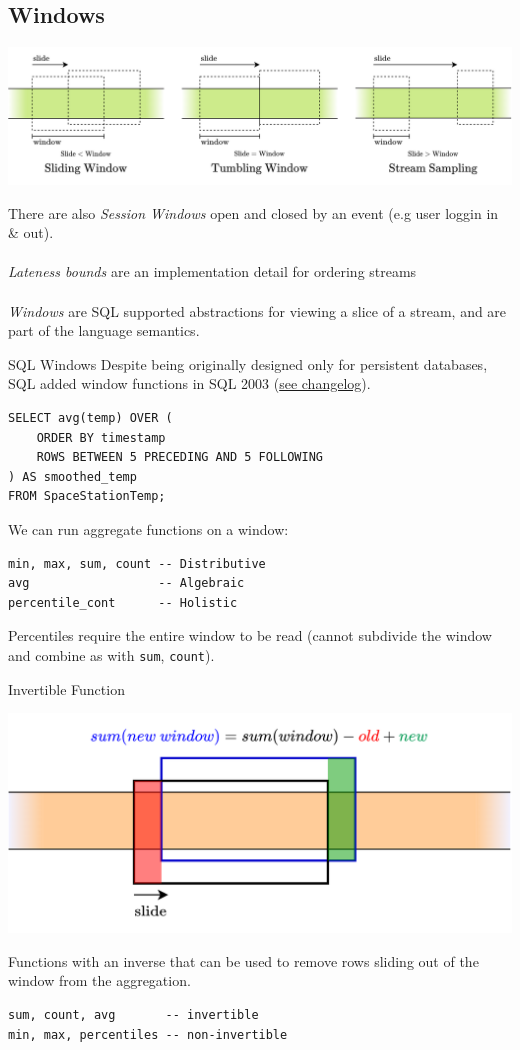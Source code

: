 \subsection{Windows}
\begin{center}
    \includegraphics[width=.9\textwidth]{streams/images/window_types.drawio.png}
\end{center}
There are also \textit{Session Windows} open and closed by an event (e.g user loggin in \& out).
\\
\\ \textit{Lateness bounds} are an implementation detail for ordering streams
\\ 
\\ \textit{Windows} are SQL supported abstractions for viewing a slice of a stream, and are part of the language semantics.
\begin{sidenotebox}{SQL Windows}
    Despite being originally designed only for persistent databases, SQL added window functions in SQL 2003 (\href{https://en.wikipedia.org/wiki/SQL:2003}{see changelog}).
\end{sidenotebox}
\begin{verbatim}
SELECT avg(temp) OVER (
    ORDER BY timestamp
    ROWS BETWEEN 5 PRECEDING AND 5 FOLLOWING
) AS smoothed_temp
FROM SpaceStationTemp;
\end{verbatim}
We can run aggregate functions on a window:
\begin{verbatim}
min, max, sum, count -- Distributive
avg                  -- Algebraic
percentile_cont      -- Holistic
\end{verbatim}
Percentiles require the entire window to be read (cannot subdivide the window and combine as with \texttt{sum}, \texttt{count}).
\begin{definitionbox}{Invertible Function}
    \begin{center}
        \includegraphics[width=.7\textwidth]{streams/images/invertible_agreggate.drawio.png}
    \end{center}
    Functions with an inverse that can be used to remove rows sliding out of the window from the aggregation.
    \begin{verbatim}
sum, count, avg       -- invertible
min, max, percentiles -- non-invertible
    \end{verbatim}
\end{definitionbox}

